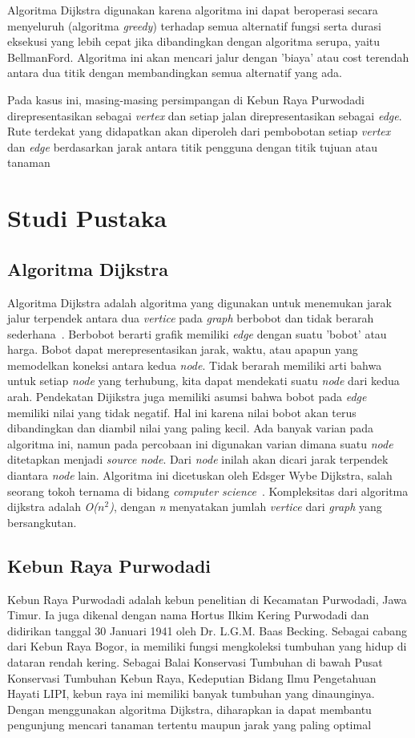 \documentclass[conference]{IEEEtran}
\begin{document}
Algoritma Dijkstra digunakan karena algoritma ini dapat beroperasi secara menyeluruh (algoritma \textit{greedy}) terhadap semua alternatif fungsi serta durasi eksekusi yang lebih cepat jika dibandingkan dengan algoritma serupa, yaitu BellmanFord. Algoritma ini akan mencari jalur dengan ’biaya’ atau cost terendah antara dua titik dengan membandingkan semua alternatif yang ada.

Pada kasus ini, masing-masing persimpangan di Kebun Raya Purwodadi direpresentasikan sebagai \textit{vertex} dan setiap jalan direpresentasikan sebagai \textit{edge}. Rute terdekat yang didapatkan akan diperoleh dari pembobotan setiap  \textit{vertex} dan  \textit{edge} berdasarkan jarak antara titik pengguna dengan titik tujuan atau tanaman

\section{Studi Pustaka}
\subsection{Algoritma Dijkstra}
Algoritma Dijkstra adalah algoritma yang digunakan untuk menemukan jarak jalur terpendek antara dua  \textit{vertice} pada  \textit{graph} berbobot dan tidak berarah sederhana~\cite{Rosen2011}. Berbobot berarti graﬁk memiliki  \textit{edge} dengan suatu ’bobot’ atau harga. Bobot dapat merepresentasikan jarak, waktu, atau apapun yang memodelkan koneksi antara kedua  \textit{node}. Tidak berarah memiliki arti bahwa untuk setiap  \textit{node} yang terhubung, kita dapat mendekati suatu  \textit{node} dari kedua arah. Pendekatan Dijikstra juga memiliki asumsi bahwa bobot pada  \textit{edge} memiliki nilai yang tidak negatif. Hal ini karena nilai bobot akan terus dibandingkan dan diambil nilai yang paling kecil. Ada banyak varian pada algoritma ini, namun pada percobaan ini digunakan varian dimana suatu  \textit{node} ditetapkan menjadi  \textit{source node}. Dari  \textit{node} inilah akan dicari jarak terpendek diantara  \textit{node} lain. Algoritma ini dicetuskan oleh Edsger Wybe Dijkstra, salah seorang tokoh ternama di bidang  \textit{computer science}~\cite{dijkstra1959note}. Kompleksitas dari algoritma dijkstra adalah  \textit{O($n^2$)}, dengan \textit{n} menyatakan jumlah  \textit{vertice} dari  \textit{graph} yang bersangkutan.

\subsection{Kebun Raya Purwodadi}
Kebun Raya Purwodadi adalah kebun penelitian di Kecamatan Purwodadi, Jawa Timur. Ia juga dikenal dengan nama Hortus Ilkim Kering Purwodadi dan didirikan tanggal 30 Januari 1941 oleh Dr. L.G.M. Baas Becking. Sebagai cabang dari Kebun Raya Bogor, ia memiliki fungsi mengkoleksi tumbuhan yang hidup di dataran rendah kering. Sebagai Balai Konservasi Tumbuhan di bawah Pusat Konservasi Tumbuhan Kebun Raya, Kedeputian Bidang Ilmu Pengetahuan Hayati LIPI, kebun raya ini memiliki banyak tumbuhan yang dinaunginya. Dengan menggunakan algoritma Dijkstra, diharapkan ia dapat membantu pengunjung mencari tanaman tertentu maupun jarak yang paling optimal
\end{document}
